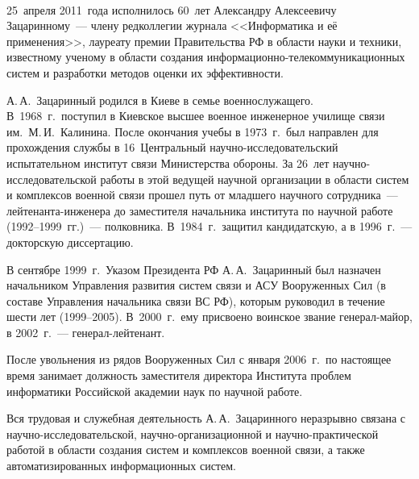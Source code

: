       \begin{multicols}{2}
      
            \label{st\stat}

\vspace*{-6pt}
\begin{center}
\mbox{%
\epsfxsize=79mm
}
\end{center}
\vspace*{9pt}

25~апреля 2011~года исполнилось 60~лет Александру Алексеевичу 
Зацаринному~--- члену редколлегии журнала <<Информатика и её 
применения>>, лауреату премии Правительства РФ в области науки и 
техники, известному ученому в области создания 
информационно-телекоммуникационных систем и разработки методов оценки их 
эффективности.
     
     А.\,А.~Зацаринный родился в Киеве в семье военнослужащего. 
В~1968~г.\ поступил в Киевское высшее военное инженерное училище связи 
им.\ М.\,И.~Калинина. После окончания учебы в 1973~г.\ был направлен для 
прохождения службы в 16~Центральный 
     на\-уч\-но-ис\-сле\-до\-ва\-тель\-ский испытательном институт связи 
Министерства обороны. За 26~лет на\-уч\-но-ис\-сле\-до\-ва\-тель\-ской 
работы в этой ведущей научной организации в области систем и комплексов 
военной связи прошел путь от младшего научного сотрудника~--- 
лей\-те\-нан\-та-ин\-же\-не\-ра до заместителя начальника института по научной 
работе (1992--1999~гг.)~--- полковника. В~1984~г.\ защитил кандидатскую, а 
в 1996~г.~--- докторскую диссертацию.
     
     В сентябре 1999~г.\ Указом Президента РФ А.\,А.~Зацаринный был 
назначен начальником Управ\-ле\-ния развития систем связи и АСУ 
Вооруженных Сил (в составе Управления начальника связи ВС РФ), которым 
руководил в течение шести лет (1999--2005). В~2000~г.\ ему присвоено 
воинское звание ге\-не\-рал-майор, в 2002~г.~--- ге\-не\-рал-лей\-те\-нант. 
     
     После увольнения из рядов Вооруженных Сил с января 2006~г.\ по 
настоящее время занимает должность заместителя директора Института 
проблем информатики Российской академии наук по научной работе.

Вся трудовая и служебная деятельность А.\,А.~Зацаринного неразрывно 
связана с на\-уч\-но-ис\-сле\-до\-ва\-тель\-ской, 
на\-уч\-но-ор\-га\-ни\-за\-ци\-он\-ной и на\-уч\-но-прак\-ти\-че\-ской работой 
в области создания систем и комплексов военной связи, а также 
автоматизированных информационных систем.
     

\end{multicols}
